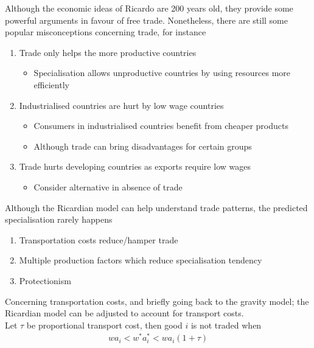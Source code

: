\documentclass{beamer}
\begin{document}
\begin{frame}
  Although the economic ideas of Ricardo are 200 years old, they provide some powerful arguments in favour of free trade. 
  Nonetheless, there are still some popular misconceptions concerning trade, for instance
  
  \begin{enumerate}
    \item Trade only helps the more productive countries
    \begin{itemize}
      \item Specialisation allows unproductive countries by using resources more efficiently
    \end{itemize}
    \medskip
    \item Industrialised countries are hurt by low wage countries
    \begin{itemize}
      \item Consumers in industrialised countries benefit from cheaper products
      \item Although trade can bring disadvantages for certain groups
    \end{itemize}
    \medskip
    \item Trade hurts developing countries as exports require low wages
    \begin{itemize}
      \item Consider alternative in absence of trade
    \end{itemize}
  \end{enumerate}
\end{frame}

\begin{frame}
  Although the Ricardian model can help understand trade patterns, the predicted specialisation rarely happens
  \medskip
  \begin{enumerate}
    \item Transportation costs reduce/hamper trade
    \item Multiple production factors which reduce specialisation tendency
    \item Protectionism
  \end{enumerate}
\end{frame}

\begin{frame}
  Concerning transportation costs, and briefly going back to the gravity model; the Ricardian model can be adjusted to account for transport costs.\\
  Let $\tau$ be proportional transport cost, then good $i$ is not traded when
  \begin{align*}
    wa_i < w^*a_i^*<wa_i(1+\tau)
  \end{align*}
\end{frame}


\end{document}
